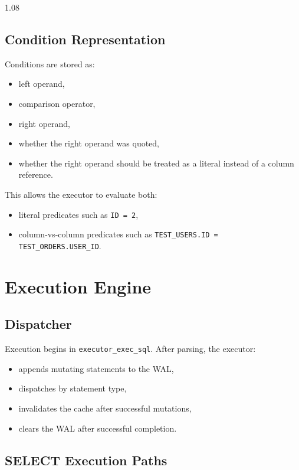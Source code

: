 \documentclass[11pt,a4paper]{article}
\begin{document}
\begin{spacing}{1.08}
\subsection{Condition Representation}

Conditions are stored as:

\begin{itemize}
    \item left operand,
    \item comparison operator,
    \item right operand,
    \item whether the right operand was quoted,
    \item whether the right operand should be treated as a literal instead of a column reference.
\end{itemize}

This allows the executor to evaluate both:

\begin{itemize}
    \item literal predicates such as \texttt{ID = 2},
    \item column-vs-column predicates such as \texttt{TEST\_USERS.ID = TEST\_ORDERS.USER\_ID}.
\end{itemize}

\section{Execution Engine}

\subsection{Dispatcher}

Execution begins in \texttt{executor\_exec\_sql}. After parsing, the executor:

\begin{itemize}
    \item appends mutating statements to the WAL,
    \item dispatches by statement type,
    \item invalidates the cache after successful mutations,
    \item clears the WAL after successful completion.
\end{itemize}

\subsection{SELECT Execution Paths}


\end{spacing}
\end{document}

